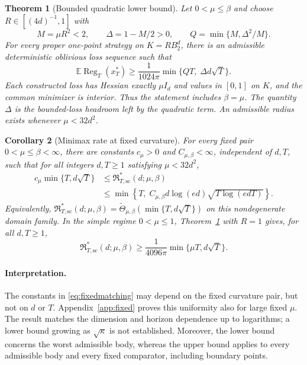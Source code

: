 \documentclass[11pt]{article}
\numberwithin{equation}{section}
\newcommand{\E}{\mathbb E}
\newcommand{\Reg}{\operatorname{Reg}}
\newtheorem{theorem}{Theorem}[section]
\newtheorem{corollary}[theorem]{Corollary}
\theoremstyle{definition}
\theoremstyle{remark}
\begin{document}
\begin{theorem}[Bounded quadratic lower bound]\label{thm:lowergeneral}\label{prop:lower}
Let $0<\mu\leq\beta$ and choose $R\in[(4d)^{-1},1]$ with
\begin{equation}\label{eq:lowerparams}
 M=\mu R^2<2,\qquad \Delta=1-M/2>0,\qquad
 Q=\min\{M,\Delta^2/M\}.
\end{equation}
For every proper one-point strategy on $K=RB_2^d$, there is an admissible
deterministic oblivious loss sequence such that
\begin{equation}\label{eq:lowergeneral}
 \E\Reg_T(x_T^*)\geq\frac{1}{1024\pi}
                  \min\{QT,\;\Delta d\sqrt T\}.
\end{equation}
Each constructed loss has Hessian exactly $\mu I_d$ and values in $[0,1]$ on
$K$, and the common minimizer is interior. Thus the statement includes
$\beta=\mu$. The quantity $\Delta$ is the bounded-loss headroom left by the quadratic
term. An admissible radius exists whenever $\mu<32d^2$.
\end{theorem}

\begin{corollary}[Minimax rate at fixed curvature]\label{cor:fixed}
For every fixed pair $0<\mu\leq\beta<\infty$, there are constants
$c_{\mu}>0$ and $C_{\mu,\beta}<\infty$, independent of $d,T$, such that for
all integers $d,T\geq1$ satisfying $\mu<32d^2$,
\begin{equation}\label{eq:fixedmatching}
 \begin{split}
 c_{\mu}\min\{T,d\sqrt T\}
 &\leq\mathfrak R^*_{T,\mathrm{sc}}(d;\mu,\beta)\\
 &\leq\min\!\left\{T,\;C_{\mu,\beta}d\log(ed)
                                     \sqrt{T\log(edT)}\right\}.
 \end{split}
\end{equation}
Equivalently,
$\mathfrak R^*_{T,\mathrm{sc}}(d;\mu,\beta)
 =\widetilde\Theta_{\mu,\beta}(\min\{T,d\sqrt T\})$
on this nondegenerate domain family. In the simple regime $0<\mu\leq1$,
Theorem~\ref{thm:lowergeneral} with $R=1$ gives, for all $d,T\geq1$,
\begin{equation}\label{eq:unitlower}
 \mathfrak R^*_{T,\mathrm{sc}}(d;\mu,\beta)
 \geq\frac1{4096\pi}\min\{\mu T,d\sqrt T\}.
\end{equation}
\end{corollary}
\paragraph{Interpretation.}
The constants in \eqref{eq:fixedmatching} may depend on the fixed curvature
pair, but not on $d$ or $T$. Appendix~\ref{app:fixed} proves this uniformity
also for large fixed $\mu$. The result matches the dimension and horizon
dependence up to logarithms; a lower bound growing as $\sqrt{\kappa}$ is
not established. Moreover, the lower bound concerns the worst admissible
body, whereas the upper bound applies to every admissible body and every
fixed comparator, including boundary points.
\end{document}
